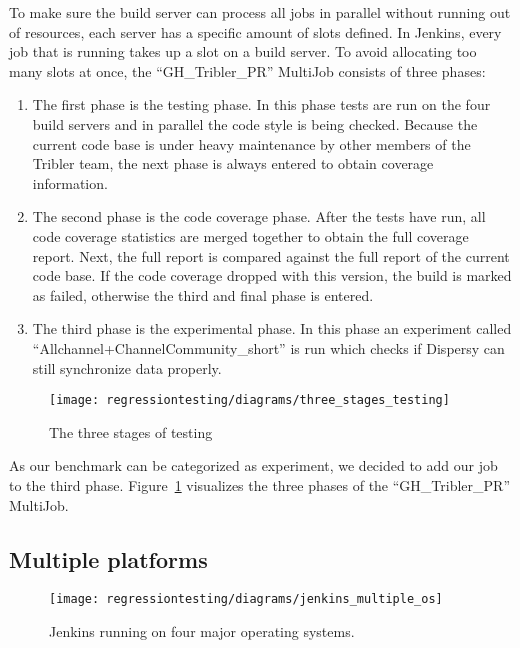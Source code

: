 To make sure the build server can process all jobs in parallel without running out of resources, each server has a specific amount of slots defined.
In Jenkins, every job that is running takes up a slot on a build server.
To avoid allocating too many slots at once, the \enquote{GH\_Tribler\_PR} MultiJob consists of three phases:

\begin{enumerate}
	\item The first phase is the testing phase. In this phase tests are run on the four build servers and in parallel the code style is being checked. Because the current code base is under heavy maintenance by other members of the Tribler team, the next phase is always entered to obtain coverage information.
	\item The second phase is the code coverage phase. After the tests have run, all code coverage statistics are merged together to obtain the full coverage report. Next, the full report is compared against the full report of the current code base. If the code coverage dropped with this version, the build is marked as failed, otherwise the third and final phase is entered.
	\item The third phase is the experimental phase. In this phase an experiment called \enquote{Allchannel+ChannelCommunity\_short} is run which checks if Dispersy can still synchronize data properly.
\end{enumerate}

\begin{figure}[!h]
	\centering
	\texttt{[image: regressiontesting/diagrams/three\_stages\_testing]}
	\caption{The three stages of testing}
	\label{fig:three_stages_of_testing}
\end{figure} 

As our benchmark can be categorized as experiment, we decided to add our job to the third phase.
Figure~\ref{fig:three_stages_of_testing} visualizes the three phases of the \enquote{GH\_Tribler\_PR} MultiJob.

\subsection{Multiple platforms}

\begin{figure}[!h]
	\centering
	\texttt{[image: regressiontesting/diagrams/jenkins\_multiple\_os]}
	\caption{Jenkins running on four major operating systems.}
	\label{fig:jenkins_multiple_os}
\end{figure} 


